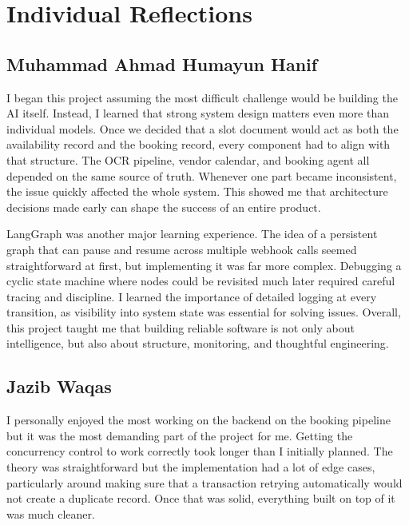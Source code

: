 \section{Individual Reflections}
\label{sec:reflect-learning}

\subsection{Muhammad Ahmad Humayun Hanif}

I began this project assuming the most difficult challenge would be building the AI itself. Instead, I learned that strong system design matters even more than individual models. Once we decided that a slot document would act as both the availability record and the booking record, every component had to align with that structure. The OCR pipeline, vendor calendar, and booking agent all depended on the same source of truth. Whenever one part became inconsistent, the issue quickly affected the whole system. This showed me that architecture decisions made early can shape the success of an entire product.

LangGraph was another major learning experience. The idea of a persistent graph that can pause and resume across multiple webhook calls seemed straightforward at first, but implementing it was far more complex. Debugging a cyclic state machine where nodes could be revisited much later required careful tracing and discipline. I learned the importance of detailed logging at every transition, as visibility into system state was essential for solving issues. Overall, this project taught me that building reliable software is not only about intelligence, but also about structure, monitoring, and thoughtful engineering.

\subsection{Jazib Waqas}

I personally enjoyed the most working on the backend on the booking pipeline but it was the most demanding part of the project for me. Getting the concurrency control to work correctly took longer than I initially planned. The theory was straightforward but the implementation had a lot of edge cases, particularly around making sure that a transaction retrying automatically would not create a duplicate record. Once that was solid, everything built on top of it was much cleaner.

